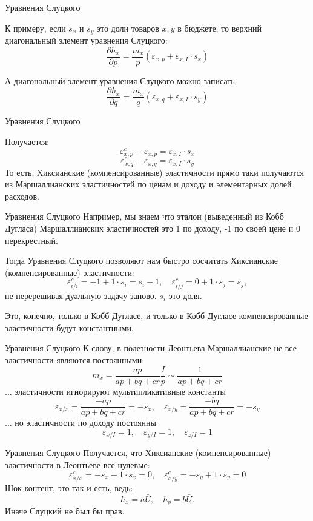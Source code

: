 \documentclass{beamer}
\begin{document}
\begin{frame}{Уравнения Слуцкого}

К примеру, если $s_x$ и $s_y$ это доли товаров $x, y$ в бюджете, то верхний диагональный элемент уравнения Слуцкого:
$$ \frac{\partial h_x}{\partial p} = \frac{m_x}{p} (\varepsilon_{x,p} + \varepsilon_{x,I} \cdot s_x)$$

А диагональный элемент уравнения Слуцкого можно записать:
$$ \frac{\partial h_x}{\partial q} = \frac{m_x}{q} (\varepsilon_{x,q} + \varepsilon_{x,I} \cdot s_y)$$

\end{frame}

\begin{frame}{Уравнения Слуцкого}

Получается:
$$ \varepsilon^c_{x,p} - \varepsilon_{x,p} = \varepsilon_{x,I} \cdot s_x$$
$$ \varepsilon^c_{x,q} - \varepsilon_{x,q} = \varepsilon_{x,I} \cdot s_y$$
То есть, Хиксианские (компенсированные) эластичности прямо таки получаются из Маршаллианских эластичностей по ценам и доходу и элементарных долей расходов.
\end{frame}

\begin{frame}{Уравнения Слуцкого}
Например, мы знаем что эталон (выведенный из Кобб Дугласа) Маршаллианских эластичностей это 1 по доходу, -1 по своей цене и 0 перекрестный. 

Тогда Уравнения Слуцкого позволяют нам быстро сосчитать Хиксианские (компенсированные) эластичности:
$$ \varepsilon^c_{i/i} = -1 + 1\cdot s_i = s_i - 1, \quad \varepsilon^c_{i/j} = 0 + 1\cdot s_j = s_j, $$
не перерешивая дуальную задачу заново. $s_i$ это доля.

Это, конечно, только в Кобб Дугласе, и только в Кобб Дугласе компенсированные эластичности будут константными.
\end{frame}

\begin{frame}{Уравнения Слуцкого}
К слову, в полезности Леонтьева Маршаллианские не все эластичности являются постоянными:
$$ m_x = \frac{ap}{ap+bq+cr}\frac{I}{p} \sim \frac{1}{ap+bq+cr}$$
... эластичности игнорируют мультипликативные константы
$$\varepsilon_{x/x} = \frac{-ap}{ap+bq+cr} = -s_x, \quad \varepsilon_{x/y} = \frac{-bq}{ap+bq+cr} = -s_y$$
... но эластичности по доходу постоянны
$$\varepsilon_{x/I} = 1, \quad \varepsilon_{y/I} = 1, \quad \varepsilon_{z/I} = 1$$
\end{frame}

\begin{frame}{Уравнения Слуцкого}
Получается, что Хиксианские (компенсированные) эластичности в Леонтьеве все нулевые:
$$\varepsilon^c_{x/x} = -s_x + 1 \cdot s_x = 0, \quad \varepsilon^c_{x/y} = -s_y + 1 \cdot s_y = 0$$
Шок-контент, это так и есть, ведь:
$$h_x = a \bar U, \quad h_y = b \bar U.$$
Иначе Слуцкий не был бы прав.
\end{frame}
\end{document}

